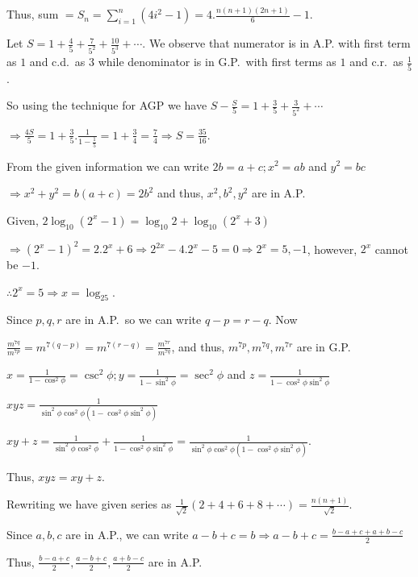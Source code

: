   Thus, sum $= S_n = \displaystyle\sum_{i = 1}^n(4i^2 - 1) = 4.\frac{n(n + 1)(2n + 1)}{6} - 1$.
\item Let $S = 1 + \frac{4}{5} + \frac{7}{5^2} + \frac{10}{5^3} + \cdots$. We observe that numerator is in
  A.P. with first term as $1$ and c.d.\ as $3$ while denominator is in G.P.\ with first terms as $1$ and
  c.r.\ as $\frac{1}{5}$.

  So using the technique for AGP we have $S - \frac{S}{5} = 1 + \frac{3}{5} + \frac{3}{5^2} + \cdots$

  $\Rightarrow \frac{4S}{5} = 1 + \frac{3}{5}.\frac{1}{1 - \frac{1}{5}} = 1 + \frac{3}{4}
  = \frac{7}{4} \Rightarrow S = \frac{35}{16}$.
\item From the given information we can write $2b = a + c; x^2 = ab$ and $y^2 = bc$

  $\Rightarrow x^2 + y^2 = b(a + c) = 2b^2$ and thus, $x^2, b^2, y^2$ are in A.P.
\item Given, $2\log_{10}(2^x - 1) = \log_{10}2 + \log_{10}(2^x + 3)$

  $\Rightarrow (2^x - 1)^2 = 2.2^x + 6 \Rightarrow 2^{2x} -4.2^x - 5 = 0 \Rightarrow 2^x = 5, -1$, however,
  $2^x$ cannot be $-1$.

  $\therefore 2^x = 5 \Rightarrow x = \log_25$.
\item Since $p, q, r$ are in A.P.\ so we can write $q - p = r - q$. Now

  $\frac{m^{7q}}{m^{7p}} = m^{7(q - p)} = m^{7(r - q)} = \frac{m^{7r}}{m^{7q}}$, and thus, $m^{7p}, m^{7q},
  m^{7r}$ are in G.P.
\item $x = \frac{1}{1 - \cos^2\phi} = \csc^2\phi; y = \frac{1}{1 - \sin^2\phi} = \sec^2\phi$ and $z
  = \frac{1}{1 - \cos^2\phi\sin^2\phi}$

  $xyz = \frac{1}{\sin^2\phi\cos^2\phi(1 - \cos^2\phi\sin^2\phi)}$

  $xy + z = \frac{1}{\sin^2\phi\cos^2\phi} + \frac{1}{1 - \cos^2\phi\sin^2\phi}
  = \frac{1}{\sin^2\phi\cos^2\phi(1 - \cos^2\phi\sin^2\phi)}$.

  Thus, $xyz = xy + z$.
\item Rewriting we have given series as $\frac{1}{\sqrt{2}}(2 + 4 + 6 + 8 + \cdots) = \frac{n(n +
  1)}{\sqrt{2}}$.
\item Since $a, b, c$ are in A.P., we can write $a - b + c = b \Rightarrow a - b + c = \frac{b - a + c + a +
  b - c}{2}$

  Thus, $\frac{b -a + c}{2}, \frac{a - b + c}{2}, \frac{a + b - c}{2}$ are in A.P.

